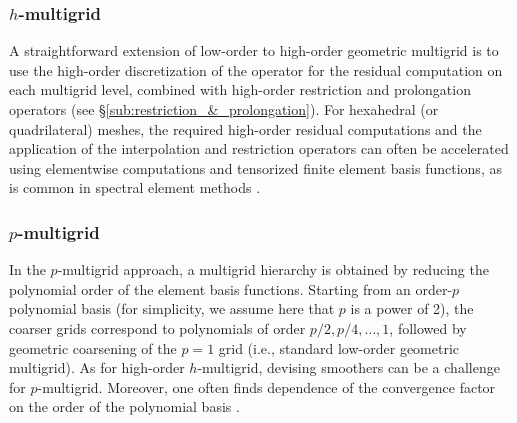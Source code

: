 \documentclass[times]{nlaauth}
\begin{document}
\subsubsection{$h$-multigrid}\label{subsec:h}
A straightforward extension of low-order to high-order geometric
multigrid is to use the high-order discretization of the operator for
the residual computation on each multigrid level, combined with
high-order restriction and prolongation operators
(see \S\ref{sub:restriction_&_prolongation}).
%
For hexahedral (or quadrilateral) meshes, the required high-order residual
computations and the application of the interpolation and restriction operators
can often be accelerated using elementwise computations and
tensorized finite element basis functions, as is common
in spectral element methods \cite{DevilleFischerMund02}.

\subsubsection{$p$-multigrid}\label{subsec:p}
In the $p$-multigrid approach, a multigrid hierarchy is obtained by reducing
the polynomial order of the element basis functions.
Starting from an order-$p$ polynomial basis (for
simplicity, we assume here that $p$ is a power of 2), the coarser
grids correspond to polynomials of order $p/2, p/4,\ldots,1$, followed
by geometric coarsening of the $p=1$ grid (i.e., standard low-order
geometric multigrid).  As for high-order $h$-multigrid, devising
smoothers can be a challenge for $p$-multigrid.  Moreover, one often
finds dependence of the convergence factor on the order of the
polynomial basis \cite{MadayMunoz89}.
\end{document}
